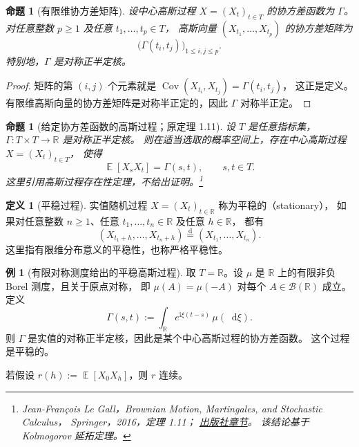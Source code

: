 \documentclass[UTF8,11pt,a4paper,oneside,fontset=fandol]{ctexrep}
\numberwithin{equation}{section}
\theoremstyle{plain}
\newtheorem{proposition}[theorem]{命题}
\theoremstyle{definition}
\newtheorem{definition}[theorem]{定义}
\newtheorem{example}[theorem]{例}
\theoremstyle{remark}
\newcommand{\R}{\mathbb{R}}
\newcommand{\B}{\mathcal{B}}
\DeclareMathOperator{\E}{\mathbb{E}}
\DeclareMathOperator{\Cov}{Cov}
\newcommand{\dd}{\mathop{}\!\mathrm{d}}
\begin{document}
\begin{proposition}[有限维协方差矩阵]
\label{prop:gaussian-process-finite-covariance}
设中心高斯过程 $X=(X_t)_{t\in T}$ 的协方差函数为 $\Gamma$。
对任意整数 $p\ge1$ 及任意 $t_1,\ldots,t_p\in T$，
高斯向量 $(X_{t_1},\ldots,X_{t_p})$ 的协方差矩阵为
\[
  \bigl(\Gamma(t_i,t_j)\bigr)_{1\le i,j\le p}.
\]
特别地，$\Gamma$ 是对称正半定核。
\end{proposition}

\begin{proof}
矩阵的第 $(i,j)$ 个元素就是 $\Cov(X_{t_i},X_{t_j})=\Gamma(t_i,t_j)$，
这正是定义。有限维高斯向量的协方差矩阵是对称半正定的，因此 $\Gamma$ 对称半正定。
\end{proof}

\begin{proposition}[给定协方差函数的高斯过程；原定理 1.11]
\label{prop:gaussian-process-covariance-existence}
设 $T$ 是任意指标集，$\Gamma:T\times T\to\R$ 是对称正半定核。
则在适当选取的概率空间上，存在中心高斯过程 $X=(X_t)_{t\in T}$，
使得
\[
  \E[X_sX_t]=\Gamma(s,t),\qquad s,t\in T.
\]
这里引用高斯过程存在性定理，不给出证明。\footnote{%
Jean-Fran\c{c}ois Le Gall，\emph{Brownian Motion, Martingales, and Stochastic Calculus}，
Springer，2016，定理 1.11；
\href{https://link.springer.com/chapter/10.1007/978-3-319-31089-3_1}{出版社章节}。
该结论基于 Kolmogorov 延拓定理。}
\end{proposition}

\begin{definition}[平稳过程]
\label{def:stationary-process}
实值随机过程 $X=(X_t)_{t\in\R}$ 称为平稳的（stationary），
如果对任意整数 $n\ge1$、任意 $t_1,\ldots,t_n\in\R$ 及任意 $h\in\R$，
都有
\[
  (X_{t_1+h},\ldots,X_{t_n+h})
  \stackrel{\mathrm d}{=}(X_{t_1},\ldots,X_{t_n}).
\]
这里指有限维分布意义的平稳性，也称严格平稳性。
\end{definition}

\begin{example}[有限对称测度给出的平稳高斯过程]
\label{ex:stationary-gaussian-spectral-measure}
取 $T=\R$。设 $\mu$ 是 $\R$ 上的有限非负 Borel 测度，且关于原点对称，
即 $\mu(A)=\mu(-A)$ 对每个 $A\in\B(\R)$ 成立。
定义
\begin{equation}
  \label{eq:stationary-gaussian-spectral-kernel}
  \Gamma(s,t)
  :=\int_{\R}e^{\mathrm i\xi(t-s)}\,\mu(\dd\xi).
\end{equation}
则 $\Gamma$ 是实值的对称正半定核，因此是某个中心高斯过程的协方差函数。
这个过程是平稳的。

若假设 $r(h):=\E[X_0X_h]$，则 $r$ 连续。
\end{example}
\end{document}
